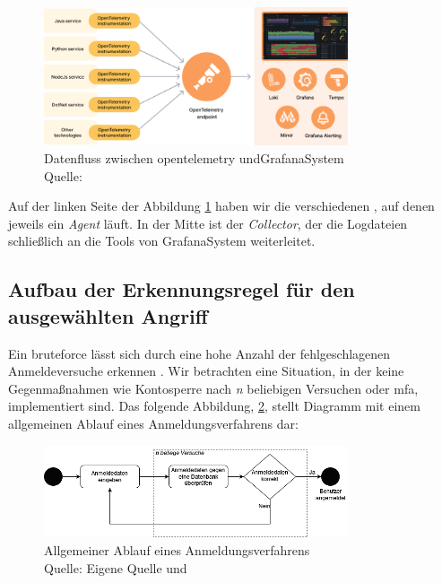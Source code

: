 \begin{figure}[H]
   \centering
   \includegraphics[width=0.8\textwidth]{assets/Grafana_OpenTelemtry.png}
   \caption[Datenfluss zwischen \gls{opentelemetry} und die Tools von \gls{GrafanaSystem}]
   {Datenfluss zwischen \gls{opentelemetry} und\gls{GrafanaSystem}\\Quelle: \citep{Grafana_WhatOpentelemetry}}
   \label{fig:UsingOpenTelemetry}
   \centering
\end{figure}

Auf der linken Seite der Abbildung \ref{fig:UsingOpenTelemetry} haben wir die verschiedenen , auf denen jeweils ein \textit{Agent} läuft. In der Mitte ist der \textit{Collector}, der die Logdateien schließlich an die Tools von \gls{GrafanaSystem} weiterleitet.

\newpage
\subsection{Aufbau der Erkennungsregel für den ausgewählten Angriff}
Ein \gls{bruteforce} lässt sich durch eine hohe Anzahl der fehlgeschlagenen Anmeldeversuche erkennen \citep{Selvaganesh_SplunkBruteForce}. Wir betrachten eine Situation, in der keine Gegenmaßnahmen wie Kontosperre nach \textit{n} beliebigen Versuchen oder \gls{mfa}, implementiert sind. Das folgende Abbildung, \ref{fig:Aktivitaetsdiagramm_Anmeldung}, stellt Diagramm mit einem allgemeinen Ablauf eines Anmeldungsverfahrens dar:

\begin{figure}[H]
   \centering
   \includegraphics[width=0.8\textwidth]{assets/Anmeldeverfahren.drawio.png}
   \caption[Allgemeiner Ablauf eines Anmeldungsverfahrens]
   {Allgemeiner Ablauf eines Anmeldungsverfahrens \\Quelle: Eigene Quelle und \citep{Selvaganesh_SplunkBruteForce}}
   \label{fig:Aktivitaetsdiagramm_Anmeldung}
   \centering
\end{figure}

